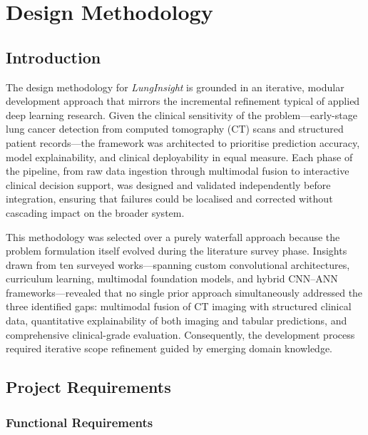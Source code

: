 \chapter{Design Methodology}
\graphicspath{{Chapter3/figures/}}
{


\section{Introduction}

The design methodology for \textit{LungInsight} is grounded in an iterative, modular development approach that mirrors the incremental refinement typical of applied deep learning research. Given the clinical sensitivity of the problem---early-stage lung cancer detection from computed tomography (CT) scans and structured patient records---the framework was architected to prioritise prediction accuracy, model explainability, and clinical deployability in equal measure. Each phase of the pipeline, from raw data ingestion through multimodal fusion to interactive clinical decision support, was designed and validated independently before integration, ensuring that failures could be localised and corrected without cascading impact on the broader system.

This methodology was selected over a purely waterfall approach because the problem formulation itself evolved during the literature survey phase. Insights drawn from ten surveyed works---spanning custom convolutional architectures, curriculum learning, multimodal foundation models, and hybrid CNN--ANN frameworks---revealed that no single prior approach simultaneously addressed the three identified gaps: multimodal fusion of CT imaging with structured clinical data, quantitative explainability of both imaging and tabular predictions, and comprehensive clinical-grade evaluation. Consequently, the development process required iterative scope refinement guided by emerging domain knowledge.


\section{Project Requirements}

\subsection{Functional Requirements}

}
